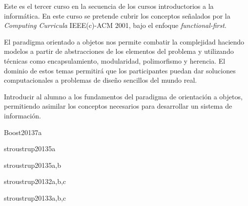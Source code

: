 \begin{syllabus}


\begin{justification}
Este es el tercer curso en la secuencia de los cursos introductorios a la informática. En este curso se pretende cubrir los conceptos señalados por la \textit{Computing Curricula} IEEE(c)-ACM 2001, bajo el enfoque \textit{functional-first}. 

El paradigma orientado a objetos nos permite combatir la
complejidad haciendo modelos a partir de abstracciones de los elementos del problema y utilizando técnicas como encapsulamiento,
modularidad, polimorfismo y herencia. El dominio de estos temas permitirá que los participantes puedan dar soluciones computacionales a problemas de diseño sencillos del mundo real.
\end{justification}

\begin{goals}
\item Introducir al alumno a los fundamentos del paradigma de orientación a objetos, permitiendo asimilar los conceptos necesarios para desarrollar un sistema de información.
\end{goals}



\begin{unit}{\DSGraphsAndTreesDef}{}{Boost2013}{7}{a}
    \DSGraphsAndTreesAllTopics
    \DSGraphsAndTreesAllObjectives
\end{unit}

\begin{unit}{\PFFundamentalConstructsDef}{}{stroustrup2013}{5}{a}
    \PFFundamentalConstructsAllTopics
    \PFFundamentalConstructsAllObjectives
\end{unit}

\begin{unit}{\PFAlgorithmsAndProblemSolvingDef}{}{stroustrup2013}{5}{a,b}
    \PFAlgorithmsAndProblemSolvingAllTopics
    \PFAlgorithmsAndProblemSolvingAllObjectives
\end{unit}

\begin{unit}{\PFEventDrivenProgrammingDef}{}{stroustrup2013}{2}{a,b,c}
   \PFEventDrivenProgrammingAllTopics
   \PFEventDrivenProgrammingAllObjectives
\end{unit}

\begin{unit}{\ALBasicAnalysisDef}{}{stroustrup2013}{3}{a,b,c}
   \begin{topics}
      \item \ALBasicAnalysisTopicAsymptotic
      \item \ALBasicAnalysisTopicIdentifying
   \end{topics}
   \begin{learningoutcomes}
      \item \ALBasicAnalysisObjTHREE
   \end{learningoutcomes}
\end{unit}


\end{syllabus}
